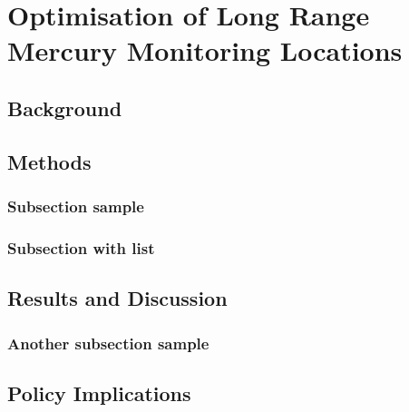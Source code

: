 \chapter{Optimisation of Long Range Mercury Monitoring Locations}
\section{Background}



\section{Methods}

\subsection{Subsection sample}


\subsection{Subsection with list}



\section{Results and Discussion}


\subsection{Another subsection sample}
\section{Policy Implications}